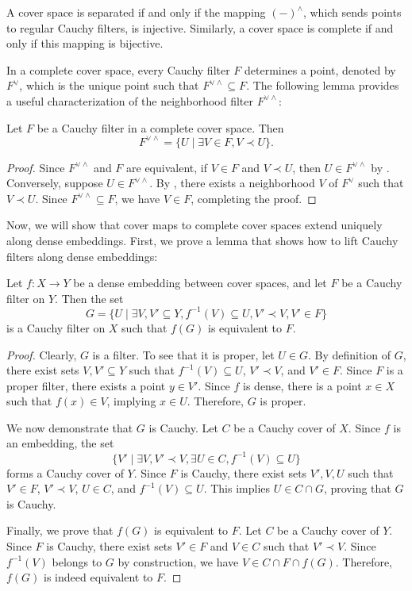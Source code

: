 \documentclass[pdflatex,sn-mathphys-num]{sn-jnl}
\theoremstyle{definition}
\theoremstyle{remark}
\numberwithin{figure}{section}
\newcommand{\rb}{\prec}
\begin{document}
\begin{remark}
A cover space is separated if and only if the mapping $(-)^\wedge$, which sends points to regular Cauchy filters, is injective.
Similarly, a cover space is complete if and only if this mapping is bijective.
\end{remark}

In a complete cover space, every Cauchy filter $F$ determines a point, denoted by $F^\vee$, which is the unique point such that $F^{\vee \wedge} \subseteq F$.
The following lemma provides a useful characterization of the neighborhood filter $F^{\vee \wedge}$:

\begin{lem}
Let $F$ be a Cauchy filter in a complete cover space.
Then
\[ F^{\vee \wedge} = \{ U \mid \exists V \in F, V \rb U \}. \]
\end{lem}
\begin{proof}
Since $F^{\vee \wedge}$ and $F$ are equivalent, if $V \in F$ and $V \rb U$, then $U \in F^{\vee \wedge}$ by .
Conversely, suppose $U \in F^{\vee \wedge}$.
By , there exists a neighborhood $V$ of $F^\vee$ such that $V \rb U$.
Since $F^{\vee \wedge} \subseteq F$, we have $V \in F$, completing the proof.
\end{proof}

Now, we will show that cover maps to complete cover spaces extend uniquely along dense embeddings.
First, we prove a lemma that shows how to lift Cauchy filters along dense embeddings:

\begin{lem}
Let $f : X \to Y$ be a dense embedding between cover spaces, and let $F$ be a Cauchy filter on $Y$.
Then the set
\[ G = \{ U \mid \exists V,V' \subseteq Y, f^{-1}(V) \subseteq U, V' \rb V, V' \in F \} \]
is a Cauchy filter on $X$ such that $f(G)$ is equivalent to $F$.
\end{lem}
\begin{proof}
Clearly, $G$ is a filter.
To see that it is proper, let $U \in G$.
By definition of $G$, there exist sets $V, V' \subseteq Y$ such that $f^{-1}(V) \subseteq U$, $V' \rb V$, and $V' \in F$.
Since $F$ is a proper filter, there exists a point $y \in V'$.
Since $f$ is dense, there is a point $x \in X$ such that $f(x) \in V$, implying $x \in U$.
Therefore, $G$ is proper.

We now demonstrate that $G$ is Cauchy.
Let $C$ be a Cauchy cover of $X$.
Since $f$ is an embedding, the set
\[ \{ V' \mid \exists V, V' \rb V, \exists U \in C, f^{-1}(V) \subseteq U \} \]
forms a Cauchy cover of $Y$.
Since $F$ is Cauchy, there exist sets $V',V,U$ such that $V' \in F$, $V' \rb V$, $U \in C$, and $f^{-1}(V) \subseteq U$.
This implies $U \in C \cap G$, proving that $G$ is Cauchy.

Finally, we prove that $f(G)$ is equivalent to $F$.
Let $C$ be a Cauchy cover of $Y$.
Since $F$ is Cauchy, there exist sets $V' \in F$ and $V \in C$ such that $V' \rb V$.
Since $f^{-1}(V)$ belongs to $G$ by construction, we have $V \in C \cap F \cap f(G)$.
Therefore, $f(G)$ is indeed equivalent to $F$.
\end{proof}
\end{document}
